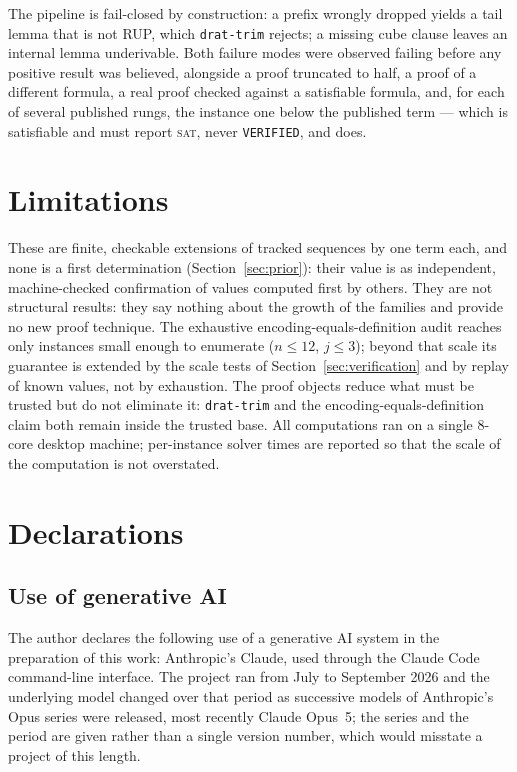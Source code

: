 \documentclass[12pt]{article}
\theoremstyle{remark}
\begin{document}
The pipeline is fail-closed by construction: a prefix wrongly dropped yields
a tail lemma that is not RUP, which \texttt{drat-trim} rejects; a missing
cube clause leaves an internal lemma underivable. Both failure modes were
observed failing before any positive result was believed, alongside a proof
truncated to half, a proof of a different formula, a real proof checked
against a satisfiable formula, and, for each of several published rungs, the
instance one below the published term --- which is satisfiable and must
report \textsc{sat}, never \texttt{VERIFIED}, and does.

\section{Limitations}\label{sec:limitations}

These are finite, checkable extensions of tracked sequences by one term
each, and none is a first determination (Section~\ref{sec:prior}): their
value is as independent, machine-checked confirmation of values computed
first by others. They are not structural results: they say nothing about the growth of
the families and provide no new proof technique. The exhaustive
encoding-equals-definition audit reaches only instances small enough to
enumerate ($n \le 12$, $j \le 3$); beyond that scale its guarantee is
extended by the scale tests of Section~\ref{sec:verification} and by replay
of known values, not by exhaustion. The proof objects reduce what must be
trusted but do not eliminate it: \texttt{drat-trim} and the
encoding-equals-definition claim both remain inside the trusted base. All
computations ran on a single 8-core
desktop machine; per-instance solver times are reported so that the scale of
the computation is not overstated.

\section{Declarations}\label{sec:authorship}

\subsection*{Use of generative AI}

The author declares the following use of a generative AI system in the
preparation of this work: Anthropic's Claude, used through the Claude Code
command-line interface. The project ran from July to September 2026 and the
underlying model changed over that period as successive models of Anthropic's
Opus series were released, most recently Claude Opus~5; the series and the
period are given rather than a single version number, which would misstate a
project of this length.
\end{document}

